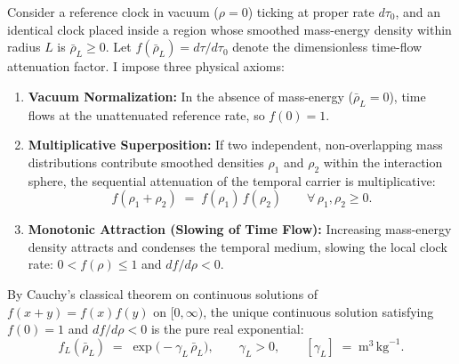 \documentclass[10pt,a4paper]{article}
\begin{document}
\par
Consider a reference clock in vacuum ($\rho = 0$) ticking at proper rate $d\tau_0$, and an identical clock placed inside a region whose smoothed mass-energy density within radius $L$ is $\bar{\rho}_L \ge 0$. Let $f(\bar{\rho}_L) = d\tau / d\tau_0$ denote the dimensionless time-flow attenuation factor. I impose three physical axioms:
\begin{enumerate}\setlength{\itemsep}{1pt}\setlength{\parskip}{0pt}\setlength{\topsep}{1pt}
  \item \textbf{Vacuum Normalization:} In the absence of mass-energy ($\bar{\rho}_L = 0$), time flows at the unattenuated reference rate, so $f(0) = 1$.
  \item \textbf{Multiplicative Superposition:} If two independent, non-overlapping mass distributions contribute smoothed densities $\rho_1$ and $\rho_2$ within the interaction sphere, the sequential attenuation of the temporal carrier is multiplicative:
  \begin{equation}
    f(\rho_1 + \rho_2) \;=\; f(\rho_1)\,f(\rho_2) \qquad \forall\,\rho_1,\rho_2 \ge 0.
  \end{equation}
  \item \textbf{Monotonic Attraction (Slowing of Time Flow):} Increasing mass-energy density attracts and condenses the temporal medium, slowing the local clock rate: $0 < f(\rho) \le 1$ and $df/d\rho < 0$.
\end{enumerate}
By Cauchy's classical theorem on continuous solutions of $f(x+y)=f(x)f(y)$ on $[0,\infty)$, the unique continuous solution satisfying $f(0)=1$ and $df/d\rho < 0$ is the pure real exponential:
\begin{equation}
  f_L(\bar{\rho}_L) \;=\; \exp\!\bigl(-\gamma_L\,\bar{\rho}_L\bigr), \qquad \gamma_L > 0, \qquad [\gamma_L] \;=\; \text{m}^3\,\text{kg}^{-1}.
\end{equation}
\end{document}
